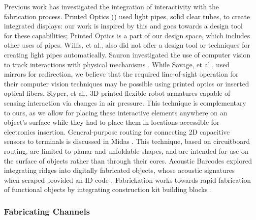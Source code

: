 Previous work has investigated the integration of interactivity with the fabrication process.  Printed Optics (\cite{Willis-printedoptics}) used light pipes, solid clear tubes, to create integrated displays: our work is inspired by this and goes towards a design tool for these capabilities; Printed Optics is a part of our design space, which includes other uses of pipes.  Willis, et al., also did not offer a design tool or techniques for creating light pipes automatically.  Sauron investigated the use of computer vision to track interactions with physical mechanisms \cite{Savage-sauron}.  While Savage, et al., used mirrors for redirection, we believe that the required line-of-sight operation for their computer vision techniques may be possible using printed optics or inserted optical fibers.  Slyper, et al., \cite{Slyper-pressure} 3D printed flexible robot armatures capable of sensing interaction via changes in air pressure.  This technique is complementary to ours, as we allow for placing these interactive elements anywhere on an object's surface while they had to place them in locations accessible for electronics insertion.  General-purpose routing for connecting 2D capacitive sensors to terminals is discussed in Midas \cite{Savage-midas}.  This technique, based on circuitboard routing, are limited to planar and unfoldable shapes, and are intended for use on the surface of objects rather than through their cores.  Acoustic Barcodes explored integrating ridges into digitally fabricated objects, whose acoustic signatures when scraped provided an ID code \cite{Harrison-acoustic}.  Fabrickation works towards rapid fabrication of functional objects by integrating construction kit building blocks \cite{Mueller-fabrickation}.

\subsubsection{Fabricating Channels}

